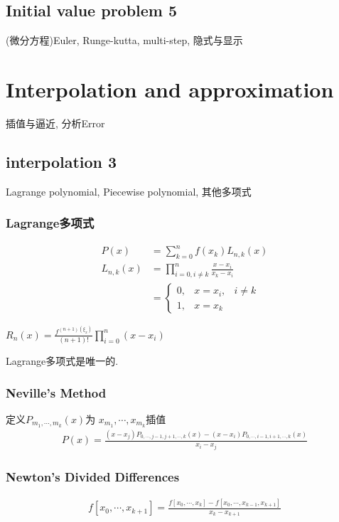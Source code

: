 \documentclass{source/Paper}
\begin{document}
    \subsection{Initial value problem 5}
    (微分方程)Euler, Runge-kutta, multi-step, 隐式与显示

\section{Interpolation and approximation}
    插值与逼近, 分析Error

    \subsection{interpolation 3}
    Lagrange polynomial, Piecewise polynomial, 其他多项式

    \subsubsection{Lagrange多项式}
    \begin{align*}
        P(x)&=\sum_{k=0}^nf(x_k)L_{n,k}(x) \\
        L_{n,k}(x)&=\prod_{i=0,i\ne k}^n\frac{x-x_i}{x_k-x_i}\\
        &=\left\{ \begin{matrix}
            0, & x=x_i, &i\ne k \\
            1, & x=x_k
        \end{matrix} \right.
    \end{align*}

    $R_n(x)=\frac{f^{(n+1)(\xi_x)}}{(n+1)!}\prod_{i=0}^n(x-x_i)$

    Lagrange多项式是唯一的. 

    \subsubsection{Neville’s Method}
    定义$P_{m_1,\cdots, m_k}(x)$为 $x_{m_1},\cdots, x_{m_k}$插值
    \begin{align*}
        P(x)=\frac{(x-x_j)P_{0,\cdots,j-1,j+1,\cdots,k}(x)-(x-x_i)P_{0,\cdots,i-1,i+1,\cdots,k}(x)}{x_i-x_j}
    \end{align*}

    \subsubsection{Newton’s Divided Differences}
    \begin{align*}
        f[x_0,\cdots,x_{k+1}]=\frac{f[x_0,\cdots,x_{k}]-f[x_0,\cdots,x_{k-1},x_{k+1}]}{x_k-x_{k+1}}
    \end{align*}
\end{document}
